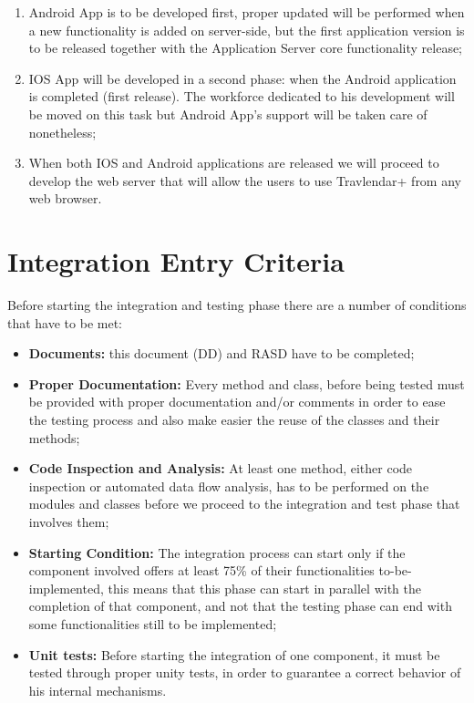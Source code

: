 \begin{enumerate}
\item Android App is to be developed first, proper updated will be performed when a new functionality is added on server-side, but the first application version is to be released together with the Application Server core functionality release;
\item IOS App will be developed in a second phase: when the Android application is completed (first release). The workforce dedicated to his development will be moved on this task but Android App's support will be taken care of nonetheless;
\item When both IOS and Android applications are released we will proceed to develop the web server that will allow the users to use Travlendar+ from any web browser.
\end{enumerate}

\section{Integration Entry Criteria}
Before starting the integration and testing phase there are a number of conditions that have to be met:
\begin{itemize}
\item \textbf{Documents:} this document (DD) and RASD have to be completed;
\item \textbf{Proper Documentation:} Every method and class, before being tested must be provided with proper documentation and/or comments in order to ease the testing process and also make easier the reuse of the classes and their methods;
\item \textbf{Code Inspection and Analysis:} At least one method, either code inspection or automated data flow analysis, has to be performed on the modules and classes before we proceed to the integration and test phase that involves them;
\item \textbf{Starting Condition:} The integration process can start only if the component involved offers at least 75\% of their functionalities to-be-implemented, this means that this phase can start in parallel with the completion of that component, and not that the testing phase can end with some functionalities still to be implemented; 
\item \textbf{Unit tests:} Before starting the integration of one component, it must be tested through proper unity tests, in order to guarantee a correct behavior of his internal mechanisms.
\end{itemize}
